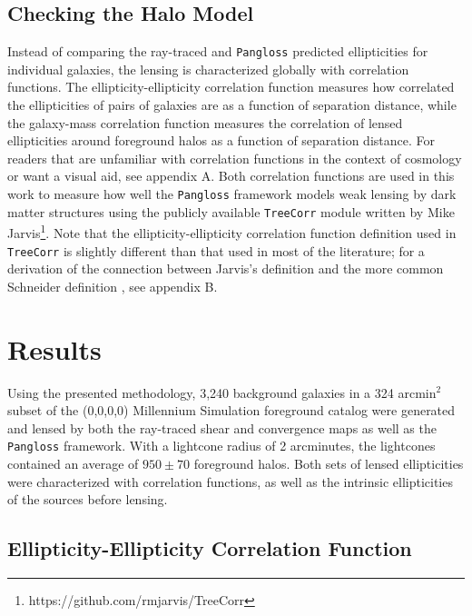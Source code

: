 \documentclass[%
 reprint,
 amsmath,amssymb,
 aps,nofootinbib
]{revtex4-1}
\begin{document}
\subsection*{Checking the Halo Model}

Instead of comparing the ray-traced and \texttt{Pangloss} predicted ellipticities for individual galaxies, the lensing is characterized globally with correlation functions. The ellipticity-ellipticity correlation function measures how correlated the ellipticities of pairs of galaxies are as a function of separation distance, while the galaxy-mass correlation function measures the correlation of lensed ellipticities around foreground halos as a function of separation distance. For readers that are unfamiliar with correlation functions in the context of cosmology or want a visual aid, see appendix A. Both correlation functions are used in this work to measure how well the \texttt{Pangloss} framework models weak lensing by dark matter structures using the publicly available \texttt{TreeCorr} module written by Mike Jarvis\footnote{https://github.com/rmjarvis/TreeCorr}. Note that the ellipticity-ellipticity correlation function definition used in \texttt{TreeCorr} is slightly different than that used in most of the literature; for a derivation of the connection between Jarvis's definition and the more common Schneider definition \cite{schneider}, see appendix B.

\section{Results}

Using the presented methodology, 3,240 background galaxies in a 324 arcmin$^2$ subset of the (0,0,0,0) Millennium Simulation foreground catalog were generated and lensed by both the ray-traced shear and convergence maps as well as the \texttt{Pangloss} framework. With a lightcone radius of 2 arcminutes, the lightcones contained an average of ${950\pm70}$ foreground halos. Both sets of lensed ellipticities were characterized with correlation functions, as well as the intrinsic ellipticities of the sources before lensing.

\subsection*{Ellipticity-Ellipticity Correlation Function}
\end{document}
